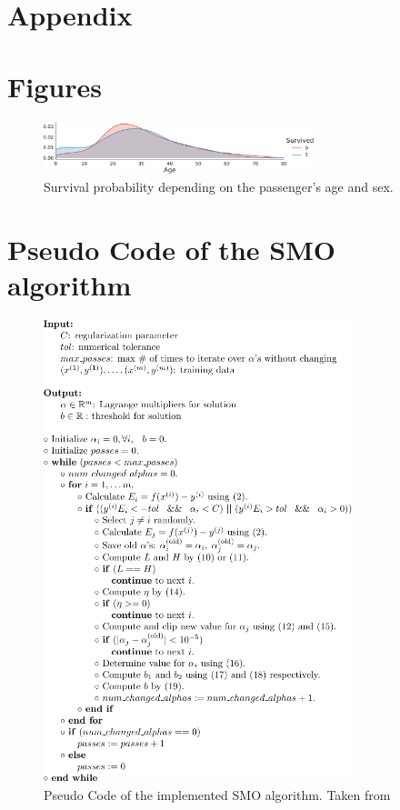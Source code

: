 \section*{Appendix}
\section{Figures}
 \begin{figure}[h]
 \centering
     \includegraphics[width=0.7\textwidth]{media_saved/age_all}
     \caption{Survival probability depending on the passenger's age and sex.}
     \label{fig:agesexfeat}
\end{figure}
\section{Pseudo Code of the SMO algorithm}
\begin{figure}[!h]
  \centering
    \includegraphics[width=0.8\textwidth]{media_saved/pseudo_code}
  \caption{Pseudo Code of the implemented SMO algorithm. Taken from\cite{smo}}  
  \label{fig:pseudo}  
\end{figure}

